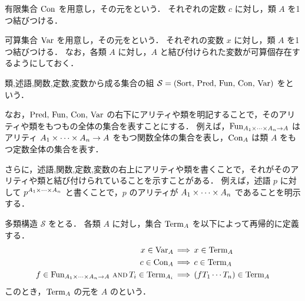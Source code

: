 \documentclass[./main]{subfiles}
\begin{document}
\begin{ziphildefi}
有限集合 $ \mathop{\mathrm{Con}}\nolimits $ を用意し，その元をという．
それぞれの定数 $ c $ に対し，類 $ A $ を1つ結びつける．
\end{ziphildefi}

\begin{ziphildefi}
可算集合 $ \mathop{\mathrm{Var}}\nolimits $ を用意し，その元をという．
それぞれの変数 $ x $ に対し，類 $ A $ を1つ結びつける．
なお，各類 $ A $ に対し，$ A $ と結び付けられた変数が可算個存在するようにしておく．
\end{ziphildefi}

\begin{ziphildefi}
類,\ats{}述語,\ats{}関数,\ats{}定数,\ats{}変数から成る集合の組 $ \mathcal{S} = (\mathop{\mathrm{Sort}}\nolimits,\, \mathop{\mathrm{Pred}}\nolimits,\, \mathop{\mathrm{Fun}}\nolimits,\, \mathop{\mathrm{Con}}\nolimits,\, \mathop{\mathrm{Var}}\nolimits) $ をという．
\end{ziphildefi}

なお，$ \mathop{\mathrm{Pred}}\nolimits,\, \mathop{\mathrm{Fun}}\nolimits,\, \mathop{\mathrm{Con}}\nolimits,\, \mathop{\mathrm{Var}}\nolimits $ の右下にアリティや類を明記することで，そのアリティや類をもつもの全体の集合を表すことにする．
例えば，$ \mathop{\mathrm{Fun}}\nolimits _{ A _1 \times \mathord{\cdots} \times A _n \to A} $ はアリティ $  A _1 \times \mathord{\cdots} \times A _n \to A $ をもつ関数全体の集合を表し，$ \mathop{\mathrm{Con}}\nolimits _A $ は類 $ A $ をもつ定数全体の集合を表す．

さらに，述語,\ats{}関数,\ats{}定数,\ats{}変数の右上にアリティや類を書くことで，それがそのアリティや類と結び付けられていることを示すことがある．
例えば，述語 $ p $ に対して $ p ^{A _1 \times \mathord{\cdots} \times A _n} $ と書くことで，$ p $ のアリティが $ A _1 \times \mathord{\cdots} \times A _n $ であることを明示する．

\begin{ziphildefi}
多類構造 $ \mathscr{S} $ をとる．
各類 $ A $ に対し，集合 $ \mathop{\mathrm{Term}}\nolimits _A $ を以下によって再帰的に定義する．
\begin{align*}
x \in \mathop{\mathrm{Var}}\nolimits _A & \,\Longrightarrow\, x \in \mathop{\mathrm{Term}}\nolimits _A \\
c \in \mathop{\mathrm{Con}}\nolimits _A & \,\Longrightarrow\, c \in \mathop{\mathrm{Term}}\nolimits _A \\
f \in \mathop{\mathrm{Fun}}\nolimits _{A _1 \times \cdots \times A _n \to A} \,\mathbin{\text{\textsc{and}}}\, T _i \in \mathop{\mathrm{Term}}\nolimits _{A _i} & \,\Longrightarrow\, (f T _1 \cdots T _n) \in \mathop{\mathrm{Term}}\nolimits _A
\end{align*}
このとき，$ \mathop{\mathrm{Term}}\nolimits _A $ の元を $ A $ のという．
\end{ziphildefi}
\end{document}
